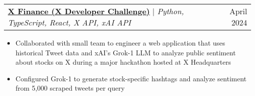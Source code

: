 \documentclass[letterpaper,11pt]{article}
\makeatletter
\newcommand{\resumeItem}[1]{
  \item\small{
    {#1 \vspace{-2pt}}
  }
}
\newcommand{\resumeProjectHeading}[2]{
    \item
    \begin{tabular*}{0.97\textwidth}{l@{\extracolsep{\fill}}r}
      \small#1 & #2 \\
    \end{tabular*}\vspace{-7pt}
}
\newcommand{\resumeItemListStart}{\begin{itemize}}
\newcommand{\resumeItemListEnd}{\end{itemize}\vspace{-5pt}}
\makeatother
\begin{document}
  \resumeProjectHeading
    {\href{https://github.com/anish-sahoo/XDevChallenge}{\textbf{X Finance (X Developer Challenge)}} $|$ \emph{Python, TypeScript, React, X API, xAI API}}{April 2024}
    \resumeItemListStart
      \resumeItem{Collaborated with small team to engineer a web application that uses historical Tweet data and xAI's Grok-1 LLM to analyze public sentiment about stocks on X during a major hackathon hosted at X Headquarters}
      \resumeItem{Configured Grok-1 to generate stock-specific hashtags and analyze sentiment from 5,000 scraped tweets per query}
    \resumeItemListEnd

    



  
\end{document}
